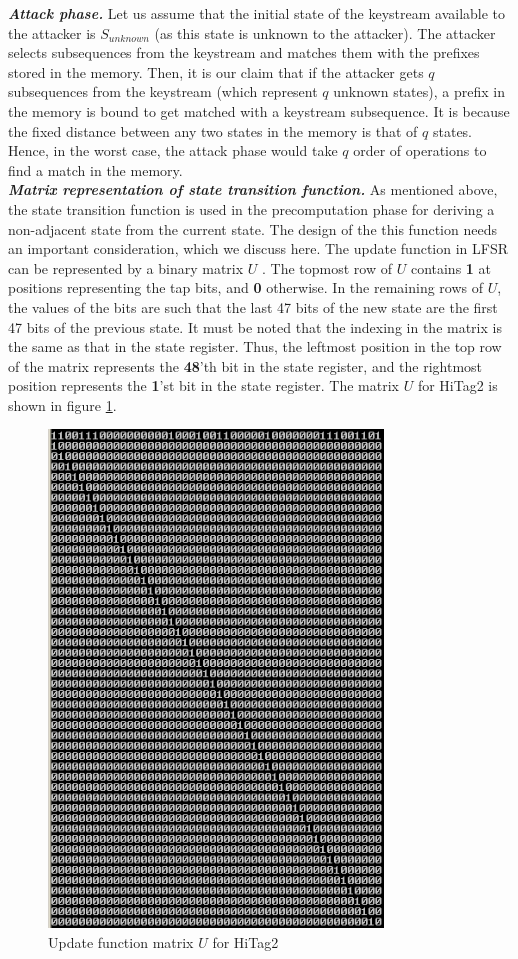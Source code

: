 \textit{\textbf{Attack phase.}} Let us assume that the initial state of the keystream available to the attacker is $S_{unknown}$ (as this state is unknown to the attacker). The attacker selects subsequences from the keystream and matches them with the prefixes stored in the memory. Then, it is our claim that if the attacker gets $q$ subsequences from the keystream (which represent $q$ unknown states), a prefix in the memory is bound to get matched with a keystream subsequence. It is because the fixed distance between any two states in the memory is that of $q$ states. Hence, in the worst case, the attack phase would take $q$ order of operations to find a match in the memory. \\

\textit{\textbf{Matrix representation of state transition function.}} As mentioned above, the state transition function is used in the precomputation phase for deriving a non-adjacent state from the current state. The design of the this function needs an important consideration, which we discuss here. The update function in LFSR can be represented by a binary matrix $U$ \cite{trappe2005icc}. The topmost row of $U$ contains \textbf{1} at positions representing the tap bits, and \textbf{0} otherwise. In the remaining rows of $U$, the values of the bits are such that the last 47 bits of the new state are the first 47 bits of the previous state. It must be noted that the indexing in the matrix is the same as that in the state register. Thus, the leftmost position in the top row of the matrix represents the \textbf{48}'th bit in the state register, and the rightmost position represents the \textbf{1}'st bit in the state register. The matrix $U$ for HiTag2 is shown in figure \ref{fig:hitag2-transition-matrix}.

\begin{figure}[h!]
	\centering
	\includegraphics[width=3.5in]{./figures/hitag2-transition-matrix.png}
	\caption{Update function matrix $U$ for HiTag2}	
	\label{fig:hitag2-transition-matrix}
\end{figure}

